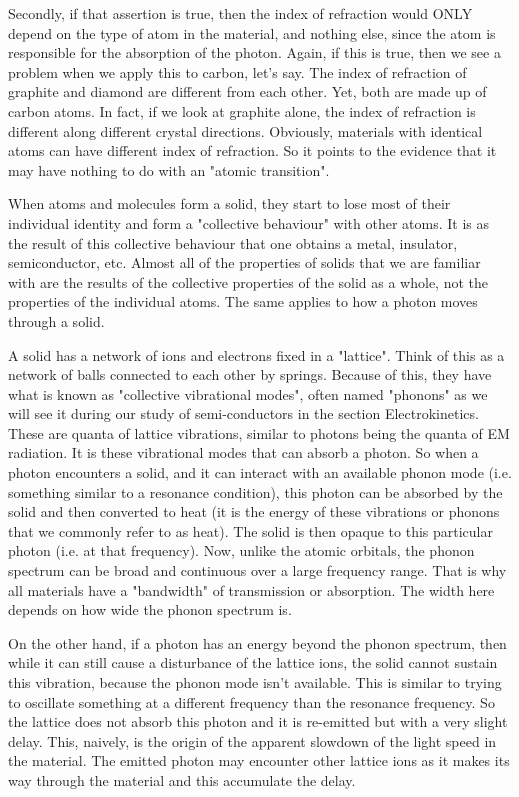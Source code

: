 	Secondly, if that assertion is true, then the index of refraction would ONLY depend on the type of atom in the material, and nothing else, since the atom is responsible for the absorption of the photon. Again, if this is true, then we see a problem when we apply this to carbon, let's say. The index of refraction of graphite and diamond are different from each other. Yet, both are made up of carbon atoms. In fact, if we look at graphite alone, the index of refraction is different along different crystal directions. Obviously, materials with identical atoms can have different index of refraction. So it points to the evidence that it may have nothing to do with an "atomic transition".

	When atoms and molecules form a solid, they start to lose most of their individual identity and form a "collective behaviour" with other atoms. It is as the result of this collective behaviour that one obtains a metal, insulator, semiconductor, etc. Almost all of the properties of solids that we are familiar with are the results of the collective properties of the solid as a whole, not the properties of the individual atoms. The same applies to how a photon moves through a solid.

	A solid has a network of ions and electrons fixed in a "lattice". Think of this as a network of balls connected to each other by springs. Because of this, they have what is known as "collective vibrational modes", often named "phonons" as we will see it during our study of semi-conductors in the section Electrokinetics. These are quanta of lattice vibrations, similar to photons being the quanta of EM radiation. It is these vibrational modes that can absorb a photon. So when a photon encounters a solid, and it can interact with an available phonon mode (i.e. something similar to a resonance condition), this photon can be absorbed by the solid and then converted to heat (it is the energy of these vibrations or phonons that we commonly refer to as heat). The solid is then opaque to this particular photon (i.e. at that frequency). Now, unlike the atomic orbitals, the phonon spectrum can be broad and continuous over a large frequency range. That is why all materials have a "bandwidth" of transmission or absorption. The width here depends on how wide the phonon spectrum is.
	
	On the other hand, if a photon has an energy beyond the phonon spectrum, then while it can still cause a disturbance of the lattice ions, the solid cannot sustain this vibration, because the phonon mode isn't available. This is similar to trying to oscillate something at a different frequency than the resonance frequency. So the lattice does not absorb this photon and it is re-emitted but with a very slight delay. This, naively, is the origin of the apparent slowdown of the light speed in the material. The emitted photon may encounter other lattice ions as it makes its way through the material and this accumulate the delay. 
	
